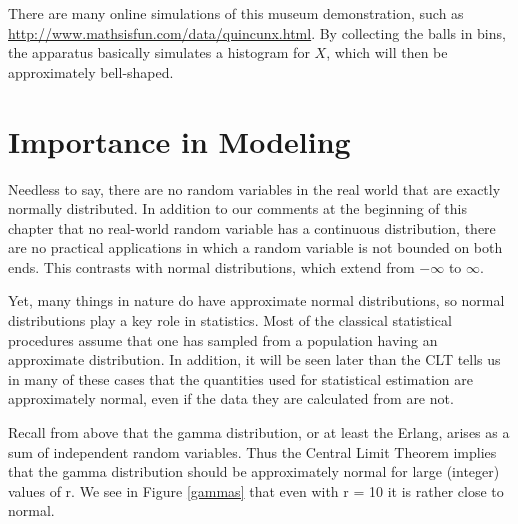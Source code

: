 There are many online simulations of this museum demonstration, such as
\url{http://www.mathsisfun.com/data/quincunx.html}.  By collecting the
balls in bins, the apparatus basically simulates a histogram for $X$,
which will then be approximately bell-shaped.

\section{Importance in Modeling}
\label{normalimp}

Needless to say, there are no random variables in the real world that
are exactly normally distributed.  In addition to our comments at the
beginning of this chapter that no real-world random variable has a
continuous distribution, there are no practical applications in which a
random variable is not bounded on both ends.  This contrasts with normal
distributions, which extend from $-\infty$ to $\infty$.

Yet, many things in nature do have approximate normal distributions, so
normal distributions play a key role in statistics.  Most of the
classical statistical procedures assume that one has sampled from a
population having an approximate distribution.  In addition, it will be
seen later than the CLT tells us in many of these cases that the
quantities used for statistical estimation are approximately normal,
even if the data they are calculated from are not.

Recall from above that the gamma distribution, or at least the Erlang,
arises as a sum of independent random variables.  Thus the Central Limit
Theorem implies that the gamma distribution should be approximately
normal for large (integer) values of r.  We see in Figure \ref{gammas}
that even with r = 10 it is rather close to normal.

